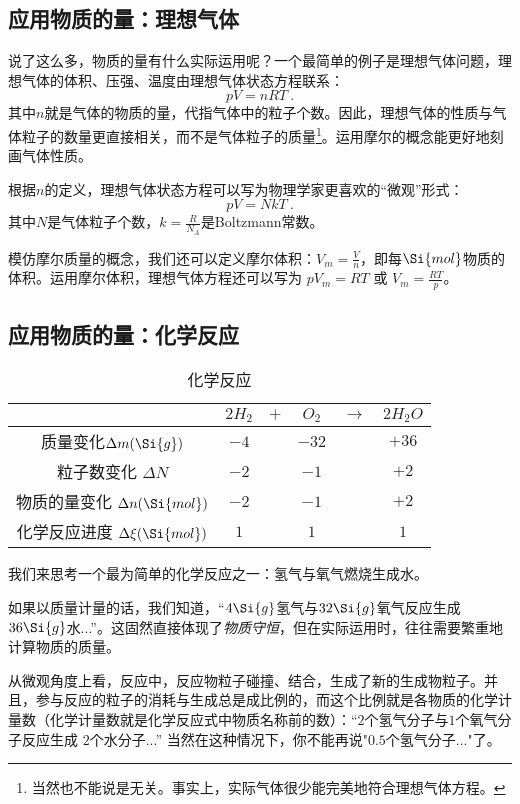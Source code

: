 \subsection{应用物质的量：理想气体}
说了这么多，物质的量有什么实际运用呢？一个最简单的例子是理想气体问题，理想气体的体积、压强、温度由理想气体状态方程联系：
$$pV=nRT~.$$
其中$n$就是气体的物质的量，代指气体中的粒子个数。因此，理想气体的性质与气体粒子的数量更直接相关，而不是气体粒子的质量\footnote{当然也不能说是无关。事实上，实际气体很少能完美地符合理想气体方程。}。运用摩尔的概念能更好地刻画气体性质。

根据$n$的定义，理想气体状态方程可以写为物理学家更喜欢的“微观”形式：
$$pV=NkT~.$$
其中$N$是气体粒子个数，$k=\frac{R}{N_A}$是Boltzmann常数。

模仿摩尔质量的概念，我们还可以定义摩尔体积：$V_m=\frac{V}{n}$，即每$\Si{mol}$物质的体积。运用摩尔体积，理想气体方程还可以写为 $p V_m = RT$ 或 $V_m = \frac{RT}{p}$。

\subsection{应用物质的量：化学反应}
\begin{table}[ht]
\centering
\caption{化学反应}\label{tab_MOLE_1}
\begin{tabular}{|c|c|c|c|c|c|}
\hline
 & $2H_2$ & $+$ & $O_2$ & $\rightarrow$ & $2H_2O$ \\
\hline
质量变化$\Delta m (\Si{g})$ & $-4$ & & $-32$ & & $+36$ \\
\hline
粒子数变化 $\Delta N$ & $-2$ &  & $-1$ & & $+2$ \\
\hline
物质的量变化 $\Delta n (\Si{mol})$ & $-2$ &  & $-1$ & & $+2$ \\
\hline
化学反应进度 $\Delta \xi (\Si{mol})$ & $1$ & & $1$ & & $1$ \\
\hline
\end{tabular}
\end{table}
我们来思考一个最为简单的化学反应之一：氢气与氧气燃烧生成水。

如果以质量计量的话，我们知道，“$4\Si{g}$氢气与$32\Si{g}$氧气反应生成 $36\Si{g}$水...”。这固然直接体现了\textsl{物质守恒}，但在实际运用时，往往需要繁重地计算物质的质量。

从微观角度上看，反应中，反应物粒子碰撞、结合，生成了新的生成物粒子。并且，参与反应的粒子的消耗与生成总是成比例的，而这个比例就是各物质的化学计量数（化学计量数就是化学反应式中物质名称前的数）：“$2$个氢气分子与$1$个氧气分子反应生成 $2$个水分子...” 当然在这种情况下，你不能再说"$0.5$个氢气分子..."了。

